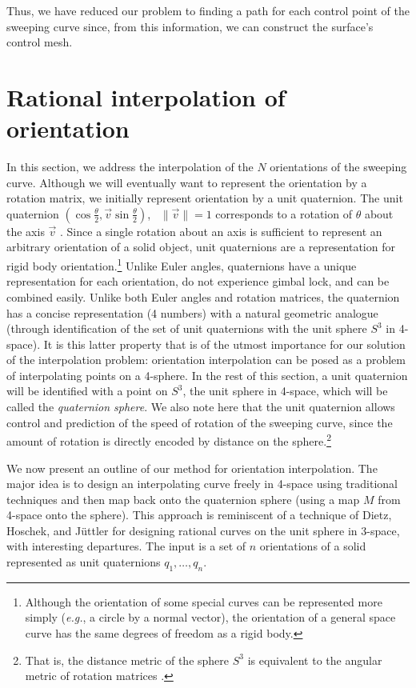 \documentclass[times]{article}
\begin{document}
Thus, we have reduced our problem to finding a path for each control point of
the sweeping curve since, from this information, 
we can construct the surface's control mesh.

\section{Rational interpolation of orientation}
\label{sec:orient-express}

In this section, we address the interpolation of the $N$ orientations
of the sweeping curve.
Although we will eventually want to represent the orientation 
by a rotation matrix, we initially 
represent orientation by a unit quaternion.
The unit quaternion
$(\cos \frac{\theta}{2}, \vec{v} \sin \frac{\theta}{2})$, \ $\|\vec{v}\| = 1$
corresponds to a rotation of $\theta$ about the axis $\vec{v}$ 
\cite{hoschek+lasser93}.
Since a single rotation about an axis is sufficient
to represent an arbitrary orientation of a solid object,
unit quaternions are a representation for rigid body 
orientation.\footnote{Although the orientation of some special curves
     can be represented more simply ({\em e.g.}, a circle by a normal 
     vector), the orientation of a general space curve has the same degrees
     of freedom as a rigid body.}
Unlike Euler angles, quaternions have a unique representation 
for each orientation, do not experience gimbal lock, and can be
combined easily.
Unlike both Euler angles and rotation matrices,
the quaternion has a concise representation (4 numbers) with a natural
geometric analogue (through identification of the set of unit quaternions 
with the unit sphere $S^3$ in 4-space).
It is this latter property that is of the utmost importance for 
our solution of the
interpolation problem: orientation interpolation can be posed as
a problem of interpolating points on a 4-sphere.
In the rest of this section, a unit quaternion will be identified
with a point on $S^3$, the unit sphere in 4-space, which will be
called the {\em quaternion sphere}.
We also note here that the unit quaternion allows control and prediction
of the speed of rotation of the sweeping curve, since the amount of
rotation is directly encoded by distance on the sphere.\footnote{That is,
	the distance metric of the sphere $S^3$ is equivalent to the
	angular metric of rotation matrices \cite{misner73}.}

We now present an outline of our method for orientation interpolation.
The major idea is to design an interpolating curve freely in 4-space
using traditional techniques and then map back onto the quaternion sphere
(using a map $M$ from 4-space onto the sphere).
This approach is reminiscent of a technique of Dietz, Hoschek, and J\"{u}ttler 
\cite{Dietz93} for designing rational curves on the unit sphere in 3-space,
with interesting departures.
The input is a set of $n$ orientations of a solid
represented as unit quaternions $q_1,\ldots,q_n$.
\end{document}
